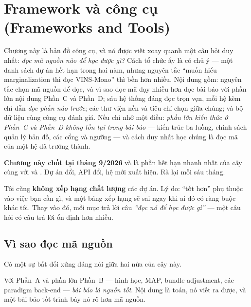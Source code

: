 \documentclass[../../vslam.tex]{subfiles}
\begin{document}
\chapter{Framework và công cụ (Frameworks and Tools)}

\begin{tomtat}
Chương này là bản đồ công cụ, và nó được viết xoay quanh một câu hỏi duy nhất: \emph{đọc mã nguồn nào để học được gì?} Cách tổ chức ấy là có chủ ý --- một danh sách dự án hết hạn trong hai năm, nhưng nguyên tắc ``muốn hiểu marginalization thì đọc VINS-Mono'' thì bền hơn nhiều. Nội dung gồm: nguyên tắc chọn mã nguồn để đọc, và vì sao đọc mã dạy nhiều hơn đọc bài báo với phần lớn nội dung Phần~C và Phần~D; sáu hệ thống đáng đọc trọn vẹn, mỗi hệ kèm chỉ dẫn \emph{đọc phần nào trước}; các thư viện nền và tiêu chí chọn giữa chúng; và bộ dữ liệu cùng công cụ đánh giá. Nếu chỉ nhớ một điều: \emph{phần lớn kiến thức ở Phần~C và Phần~D không tồn tại trong bài báo} --- kiến trúc ba luồng, chính sách quản lý bản đồ, các cổng và ngưỡng --- và cách duy nhất học chúng là đọc mã của một hệ đã trưởng thành.
\end{tomtat}

\begin{cambay}
\textbf{Chương này chốt tại tháng 9/2026} và là phần hết hạn nhanh nhất của cây cùng với  và . Dự án đổi, API đổi, hệ mới xuất hiện. Rà lại mỗi sáu tháng.

Tôi cũng \textbf{không xếp hạng chất lượng} các dự án. Lý do: ``tốt hơn'' phụ thuộc vào việc bạn cần gì, và một bảng xếp hạng sẽ sai ngay khi ai đó có ràng buộc khác tôi. Thay vào đó, mỗi mục trả lời câu \emph{``đọc nó để học được gì''} --- một câu hỏi có câu trả lời ổn định hơn nhiều.
\end{cambay}

\section{Vì sao đọc mã nguồn}

Có một sự bất đối xứng đáng nói giữa hai nửa của cây này.

Với Phần~A và phần lớn Phần~B --- hình học, MAP, bundle adjustment, các paradigm back-end --- \emph{bài báo là nguồn tốt}. Nội dung là toán, nó viết ra được, và một bài báo tốt trình bày nó rõ hơn mã nguồn.
\end{document}
